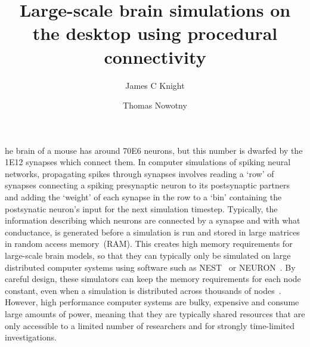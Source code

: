 \documentclass[9pt,twocolumn,twoside,lineno]{pnas-new}
\title{Large-scale brain simulations on the desktop using procedural connectivity}
\author[a,1]{James C Knight}
\author[a]{Thomas Nowotny}
\affil[a]{Centre for Computational Neuroscience and Robotics, School of Engineering and Informatics, University of Sussex, Brighton, United Kingdom}
\newcommand{\todo}[1]{\textbf{\textsc{\textcolor{red}{(TODO: #1)}}}}
\begin{document}
\maketitle
\thispagestyle{firststyle}

he brain of a mouse has around \num{70E6} neurons, but this number is dwarfed by the \num{1E12} synapses which connect them.
In computer simulations of spiking neural networks, propagating spikes through synapses involves reading a `row' of synapses connecting a spiking presynaptic neuron to its postsynaptic partners and adding the `weight' of each synapse in the row to a `bin' containing the postsynatic neuron's input for the next simulation timestep.
Typically, the information describing which neurons are connected by a synapse and with what conductance, is generated before a simulation is run and stored in large matrices in random access memory~(RAM). 
This creates high memory requirements for large-scale brain models, so that they can typically only be simulated on large distributed computer systems using software such as NEST~\citep{Gewaltig2007} or NEURON~\citep{carnevale2006neuron}.
By careful design, these simulators can keep the memory requirements for each node constant, even when a simulation is distributed across thousands of nodes~\citep{Jordan2018}.
However, high performance computer systems are bulky, expensive and consume large amounts of power, meaning that they are typically shared resources that are only accessible to a limited number of researchers and for strongly time-limited investigations.
\end{document}
